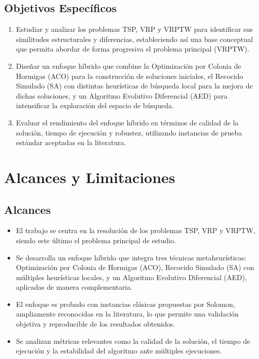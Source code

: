 \documentclass[12pt,titlepage,twoside,openright]{book}
\begin{document}
\subsection{Objetivos Específicos}

\begin{enumerate}
	\item Estudiar y analizar los problemas TSP, VRP y VRPTW para identificar sus similitudes estructurales y diferencias, estableciendo así una base conceptual que permita abordar de forma progresiva el problema principal (VRPTW).

	\item Diseñar un enfoque híbrido que combine la Optimización por Colonia de Hormigas (ACO) para la construcción de soluciones iniciales, el Recocido Simulado (SA) con distintas heurísticas de búsqueda local para la mejora de dichas soluciones, y un Algoritmo Evolutivo Diferencial (AED) para intensificar la exploración del espacio de búsqueda.

	\item Evaluar el rendimiento del enfoque híbrido en términos de calidad de la solución, tiempo de ejecución y robustez, utilizando instancias de prueba estándar aceptadas en la literatura.
\end{enumerate}

\section{Alcances y Limitaciones}

\subsection*{Alcances}

\begin{itemize}
	\item El trabajo se centra en la resolución de los problemas TSP, VRP y VRPTW, siendo este último el problema principal de estudio.

	\item Se desarrolla un enfoque híbrido que integra tres técnicas metaheurísticas: Optimización por Colonia de Hormigas (ACO), Recocido Simulado (SA) con múltiples heurísticas locales, y un Algoritmo Evolutivo Diferencial (AED), aplicadas de manera complementaria.

	\item El enfoque es probado con instancias clásicas propuestas por Solomon, ampliamente reconocidas en la literatura, lo que permite una validación objetiva y reproducible de los resultados obtenidos.

	\item Se analizan métricas relevantes como la calidad de la solución, el tiempo de ejecución y la estabilidad del algoritmo ante múltiples ejecuciones.
\end{itemize}
\end{document}
